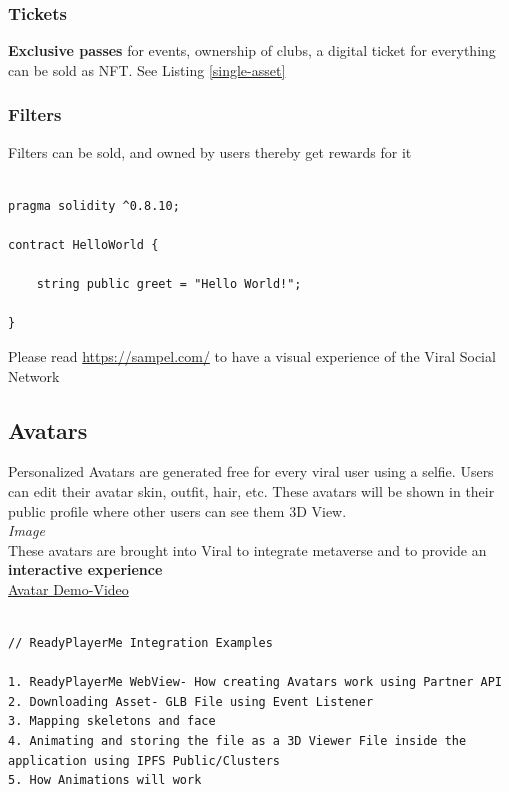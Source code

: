 \documentclass[10pt]{article}
\begin{document}
\subsubsection{Tickets}
\textbf{Exclusive passes} for events, ownership of clubs, a digital ticket for everything can be sold as NFT. See Listing \ref{single-asset}

\subsubsection{Filters}
Filters can be sold, and owned by user\textsc{}s thereby get rewards for it

\begin{lstlisting}[language=Solidity, caption={NFT Snippet to distribute shares Just like company share where if 100 NFTs is sold, the person who holds 50 NFT will hold 50\% of the company}]

pragma solidity ^0.8.10;

contract HelloWorld {

    string public greet = "Hello World!";
    
}
\end{lstlisting}

Please read \hyperlink{App Brouchure}{https://sampel.com/} to have a visual experience of the Viral Social Network

\subsection{Avatars}

Personalized Avatars are generated free for every viral user using a selfie. Users can edit their avatar skin, outfit, hair, etc. These avatars will be shown in their public profile where other users can see them 3D View.\\

\textit{Image}\\

These avatars are brought into Viral to integrate metaverse and to provide an \textbf{interactive experience}\\

\hyperlink{https://sample.com}{Avatar Demo-Video}\\

\begin{lstlisting}[language=Solidity]

// ReadyPlayerMe Integration Examples

1. ReadyPlayerMe WebView- How creating Avatars work using Partner API
2. Downloading Asset- GLB File using Event Listener
3. Mapping skeletons and face
4. Animating and storing the file as a 3D Viewer File inside the application using IPFS Public/Clusters
5. How Animations will work

\end{lstlisting}
\end{document}
